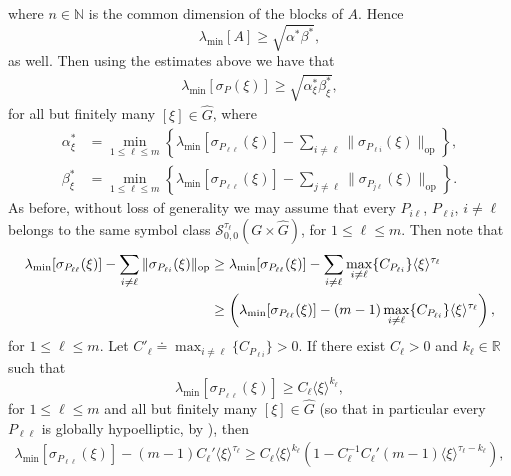 \documentclass[11pt]{amsart}
\numberwithin{theorem}{section}
\numberwithin{equation}{section}
\theoremstyle{definition}
\numberwithin{example}{section}
\theoremstyle{definition}
\theoremstyle{definition}
\newcommand{\R}{\mathbb{R}}
\newcommand{\N}{\mathbb{N}}
\begin{document}
where $n\in\N$ is the common dimension of the blocks of $A$. Hence
\begin{equation*}
    \lambda_{\min}[A]\geq \sqrt{\alpha^*\beta^*},
\end{equation*}
as well. Then using the estimates above we have that
\begin{align*}
    \lambda_{\min}[\sigma_P(\xi)]\geq \sqrt{\alpha^*_\xi\beta^*_\xi},
\end{align*}
for all but finitely many $[\xi]\in\widehat{G}$, where 
\begin{align*}
    \alpha^*_\xi&=\min_{1\leq \ell\leq m}\left\{\lambda_{\min}[\sigma_{P_{\ell\ell}}(\xi)]-\sum_{i\neq \ell}\|\sigma_{P_{\ell i}}(\xi)\|_{\operatorname{op}}\right\},\\
        \beta^*_\xi&=\min_{1\leq \ell\leq m}\left\{\lambda_{\min}[\sigma_{P_{\ell\ell}}(\xi)]-\sum_{j\neq \ell}\|\sigma_{P_{j \ell}}(\xi)\|_{\operatorname{op}}\right\}.
\end{align*}
As before, without loss of generality we may assume that every $P_{i\ell}$, $P_{\ell i}$, $i\neq \ell$ belongs to the same symbol class $\mathscr{S}_{0,0}^{\tau_\ell}(G\times \widehat{G})$, for $1\leq \ell\leq m$.
Then note that
\begin{align}
       \lambda_{\min}[\sigma_{P_{\ell\ell}}(\xi)]-\sum_{i\neq \ell}\|\sigma_{P_{\ell i}}(\xi)\|_{\operatorname{op}}\notag&\geq \lambda_{\min}[\sigma_{P_{\ell\ell}}(\xi)]-\sum_{i\neq \ell}\max_{i\neq \ell}\{C_{P_{\ell i}}\}\langle\xi\rangle^{\tau_{\ell}}\notag\\
       &\geq \left( \lambda_{\min}[\sigma_{P_{\ell\ell}}(\xi)]-(m-1)\max_{i\neq \ell}\{C_{P_{\ell i}}\}\langle\xi\rangle^{\tau_\ell}\right),\label{ineq-dominant}
\end{align}
for $1\leq \ell\leq m$. Let $C'_\ell\doteq \max_{i\neq \ell}\{C_{P_{\ell i}}\}>0$. If there exist $C_\ell>0$ and $k_\ell\in\R$ such that
\begin{equation*}
    \lambda_{\min}[\sigma_{P_{\ell\ell}}(\xi)]\geq C_\ell\langle\xi\rangle^{k_\ell},
\end{equation*}
for $1\leq \ell\leq m$ and all but finitely many $[\xi]\in\widehat{G}$ (so that in particular every $P_{\ell\ell}$ is globally hypoelliptic, by \cite[Theorem 3.1]{CardKow}), then
\begin{align*}
     \lambda_{\min}[\sigma_{P_{\ell\ell}}(\xi)]-(m-1)C_\ell'\langle\xi\rangle^{\tau_\ell}\geq  C_\ell\langle\xi\rangle^{k_\ell}\left(1- C_\ell^{-1}C_\ell' (m-1)\langle\xi\rangle^{\tau_\ell-k_\ell}\right),
\end{align*}
\end{document}
